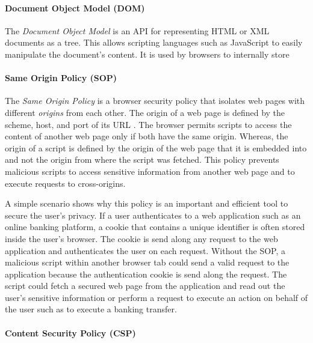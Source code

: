 \paragraph{Document Object Model (DOM)}

	The \textit{Document Object Model} is an API for representing HTML or XML documents as a tree. This allows scripting languages such as JavaScript to easily manipulate the document's content. It is used by browsers to internally store 

\paragraph{Same Origin Policy (SOP)}
	
	The \textit{Same Origin Policy} is a browser security policy that isolates web pages with different \textit{origins} from each other. The origin of a web page is defined by the scheme, host, and port of its URL \cite{w3cOriginSpecification}. The browser permits scripts to access the content of another web page only if both have the same origin. Whereas, the origin of a script is defined by the origin of the web page that it is embedded into and not the origin from where the script was fetched. This policy prevents malicious scripts to access sensitive information from another web page and to execute requests to cross-origins. 
	
	A simple scenario shows why this policy is an important and efficient tool to secure the user's privacy. If a user authenticates to a web application such as an online banking platform, a cookie that contains a unique identifier is often stored inside the user's browser. The cookie is send along any request to the web application and authenticates the user on each request. Without the SOP, a malicious script within another browser tab could send a valid request to the application because the authentication cookie is send along the request. The script could fetch a secured web page from the application and read out the user's sensitive information or perform a request to execute an action on behalf of the user such as to execute a banking transfer.  
	
\paragraph{Content Security Policy (CSP)}

